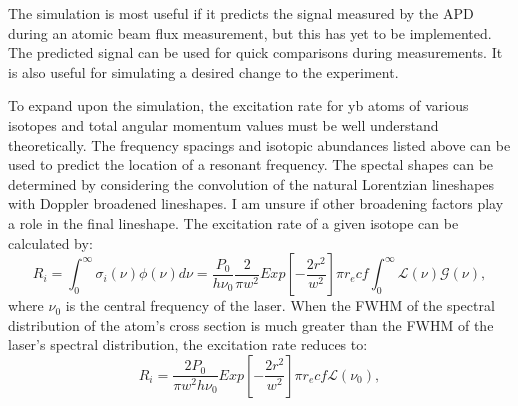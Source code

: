 \documentclass[12pt, a4paper]{article}
\begin{document}
The simulation is most useful if it predicts the signal measured by the APD during an atomic beam flux measurement, but this has yet to be implemented. The predicted signal can be used for quick comparisons during measurements. It is also useful for simulating a desired change to the experiment. 

To expand upon the simulation, the excitation rate for yb atoms of various isotopes and total angular momentum values must be well understand theoretically. The frequency spacings and isotopic abundances listed above can be used to predict the location of a resonant frequency. The spectal shapes can be determined by considering the convolution of the natural Lorentzian lineshapes with Doppler broadened lineshapes. I am unsure if other broadening factors play a role in the final lineshape. The excitation rate of a given isotope can be calculated by:
\begin{equation}
R_i = \int_{0}^{\infty}\sigma_i(\nu) \phi(\nu)d\nu = \frac{P_0}{h \nu_0} \frac{2}{\pi w^2} Exp[-\frac{2r^2}{w^2}]\pi r_e c f \int_{0}^{\infty} \mathscr{L}(\nu) \mathscr{G}(\nu),
\end{equation}
where $\nu_0$ is the central frequency of the laser. When the FWHM of the spectral distribution of the atom's cross section is much greater than the FWHM of the laser's spectral distribution, the excitation rate reduces to:
\begin{equation}
R_i =\frac{2P_0}{\pi w^2 h \nu_0} Exp[-\frac{2r^2}{w^2}] \pi r_e c f \mathscr{L} (\nu_0),
\end{equation}
\end{document}
